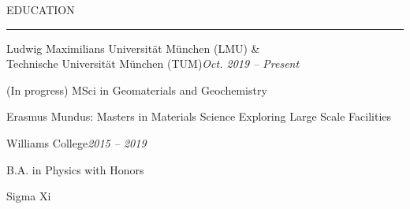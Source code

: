 \documentclass{short_resume} %
\renewenvironment{rSection}[1]{
	\sectionskip
	\textcolor{RoyalPurple}{\MakeUppercase{#1}}
	\sectionlineskip
	\hrule
	\begin{list}{}{
			\setlength{\leftmargin}{1.5em}
		}
		\item[]
	}{
	\end{list}
}
\begin{document}
	
	
	
	
	\vspace{-2em}
	\begin{rSection}{Education} 
		\begin{rSubsection}{Ludwig Maximilians Universit{\"a}t  M{\"u}nchen (LMU) \&\\Technische Universit{\"a}t M{\"u}nchen (TUM)}{\em Oct. 2019 -- Present}{}{}
			\vspace{-.5em}
			\item (In progress) MSci in Geomaterials and Geochemistry
			\item Erasmus Mundus: Masters in Materials Science Exploring Large Scale Facilities
		\end{rSubsection}
		
		\begin{rSubsection}{Williams College}{\em 2015 -- 2019}{}{}
			\vspace{-.5em}
			\item B.A. in Physics with Honors
			\item Sigma Xi
		\end{rSubsection}
		

\end{rSection}
\end{document}
